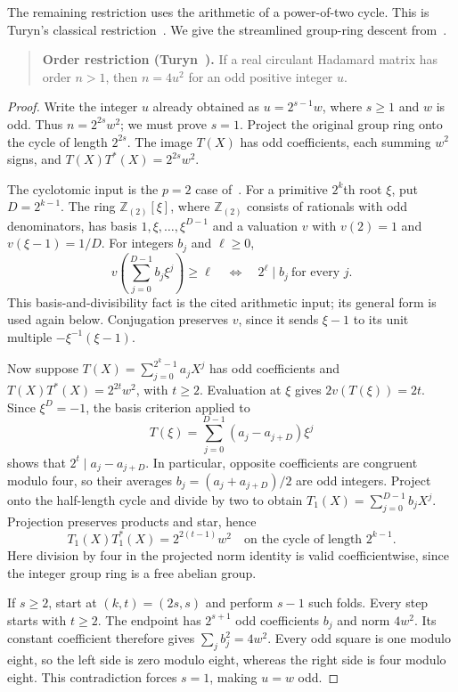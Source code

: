 \documentclass[11pt]{article}
\begin{document}
The remaining restriction uses the arithmetic of a power-of-two cycle.
This is Turyn's classical restriction~\cite[Theorem~8 and its corollary]{turyn1965}.
We give the streamlined group-ring descent
from~\cite[Proposition~2.2]{circulant-source}.
\begin{quote}
  \textbf{Order restriction (Turyn~\cite{turyn1965}).}
  If a real circulant Hadamard matrix has order $n>1$, then
  $n=4u^{2}$ for an odd positive integer $u$.
\end{quote}
\begin{proof}
Write the integer $u$ already obtained as $u=2^{s-1}w$, where $s\geq1$
and $w$ is odd. Thus $n=2^{2s}w^{2}$; we must prove $s=1$.
Project the original group ring onto the cycle of length $2^{2s}$.
The image $T(X)$ has odd coefficients, each summing $w^{2}$ signs, and
$T(X)T^{*}(X)=2^{2s}w^{2}$.

The cyclotomic input is the $p=2$ case
of~\cite[Lemma~2.1]{circulant-source}. For a primitive $2^{k}$th root
$\xi$, put $D=2^{k-1}$. The ring $\mathbb Z_{(2)}[\xi]$, where
$\mathbb Z_{(2)}$ consists of rationals with odd denominators, has basis
$1,\xi,\ldots,\xi^{D-1}$ and a valuation $v$ with
$v(2)=1$ and $v(\xi-1)=1/D$. For integers $b_{j}$ and $\ell\geq0$,
\[
  v\!\left(\sum_{j=0}^{D-1}b_{j}\xi^{j}\right)\geq\ell
  \quad\Longleftrightarrow\quad
  2^\ell\mid b_{j}\ \text{for every }j.
\]
This basis-and-divisibility fact is the cited arithmetic input; its
general form is used again below. Conjugation preserves $v$, since it
sends $\xi-1$ to its unit multiple $-\xi^{-1}(\xi-1)$.

Now suppose $T(X)=\sum_{j=0}^{2^{k}-1}a_{j}X^{j}$ has odd coefficients and
$T(X)T^{*}(X)=2^{2t}w^{2}$, with $t\geq2$. Evaluation at $\xi$ gives
$2v(T(\xi))=2t$. Since $\xi^{D}=-1$, the basis criterion applied to
\[
  T(\xi)=\sum_{j=0}^{D-1}(a_{j}-a_{j+D})\xi^{j}
\]
shows that $2^{t}\mid a_{j}-a_{j+D}$. In particular, opposite coefficients
are congruent modulo four, so their averages
$b_{j}=(a_{j}+a_{j+D})/2$ are odd integers. Project onto the half-length
cycle and divide by two to obtain $T_{1}(X)=\sum_{j=0}^{D-1}b_{j}X^{j}$.
Projection preserves products and star, hence
\[
  T_{1}(X)T_{1}^{*}(X)=2^{2(t-1)}w^{2}
  \quad\text{on the cycle of length }2^{k-1}.
\]
Here division by four in the projected norm identity is valid
coefficientwise, since the integer group ring is a free abelian group.

If $s\geq2$, start at $(k,t)=(2s,s)$ and perform $s-1$ such folds.
Every step starts with $t\geq2$. The endpoint has $2^{s+1}$ odd
coefficients $b_{j}$ and norm $4w^{2}$. Its constant coefficient therefore
gives $\sum_{j}b_{j}^{2}=4w^{2}$. Every odd square is one modulo eight, so
the left side is zero modulo eight, whereas the right side is four
modulo eight. This contradiction forces $s=1$, making $u=w$ odd.
\end{proof}
\end{document}
